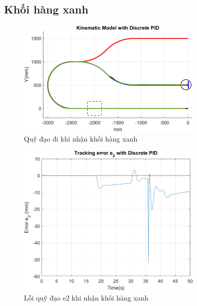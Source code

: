           \subsection{Khối hàng xanh}
               \begin{figure}[H]
                    \centering
                    \includegraphics[width=0.8\textwidth]{pictures/chapter8/trajec_blue.png}
                    \caption{Quỹ đạo đi khi nhận khối hàng xanh}
                    \label{tra_blue}
               \end{figure}
               \begin{figure}[H]
                    \centering
                    \includegraphics[width=0.8\textwidth]{pictures/chapter8/err_blue.png}
                    \caption{Lỗi quỹ đạo e2 khi nhận khối hàng xanh}
                    \label{err_blue}
               \end{figure}